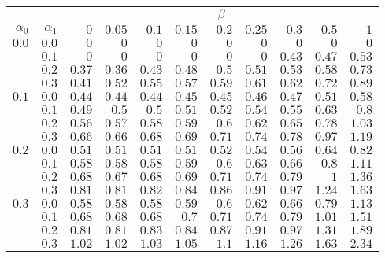 \begin{tabular}{rr|rrrrrrrrr}
\hline\hline
 && \multicolumn{9}{c}{$\beta$}\\
 $\alpha_0$ & $\alpha_1$ & $0$ & $0.05$ & $0.1$ & $0.15$ & $0.2$ & $0.25$ & $0.3$ & $0.5$ & $1$ \\ 
 \hline
$0.0$ & $0.0$ & $0$ & $0$ & $0$ & $0$ & $0$ & $0$ & $0$ & $0$ & $0$\\ 
 & $0.1$ & $0$ & $0$ & $0$ & $0$ & $0$ & $0$ & $0.43$ & $0.47$ & $0.53$\\ 
 & $0.2$ & $0.37$ & $0.36$ & $0.43$ & $0.48$ & $0.5$ & $0.51$ & $0.53$ & $0.58$ & $0.73$\\ 
 & $0.3$ & $0.41$ & $0.52$ & $0.55$ & $0.57$ & $0.59$ & $0.61$ & $0.62$ & $0.72$ & $0.89$\\ 
\hline 
 $0.1$ & $0.0$ & $0.44$ & $0.44$ & $0.44$ & $0.45$ & $0.45$ & $0.46$ & $0.47$ & $0.51$ & $0.58$\\ 
 & $0.1$ & $0.49$ & $0.5$ & $0.5$ & $0.51$ & $0.52$ & $0.54$ & $0.55$ & $0.63$ & $0.8$\\ 
 & $0.2$ & $0.56$ & $0.57$ & $0.58$ & $0.59$ & $0.6$ & $0.62$ & $0.65$ & $0.78$ & $1.03$\\ 
 & $0.3$ & $0.66$ & $0.66$ & $0.68$ & $0.69$ & $0.71$ & $0.74$ & $0.78$ & $0.97$ & $1.19$\\ 
\hline 
 $0.2$ & $0.0$ & $0.51$ & $0.51$ & $0.51$ & $0.51$ & $0.52$ & $0.54$ & $0.56$ & $0.64$ & $0.82$\\ 
 & $0.1$ & $0.58$ & $0.58$ & $0.58$ & $0.59$ & $0.6$ & $0.63$ & $0.66$ & $0.8$ & $1.11$\\ 
 & $0.2$ & $0.68$ & $0.67$ & $0.68$ & $0.69$ & $0.71$ & $0.74$ & $0.79$ & $1$ & $1.36$\\ 
 & $0.3$ & $0.81$ & $0.81$ & $0.82$ & $0.84$ & $0.86$ & $0.91$ & $0.97$ & $1.24$ & $1.63$\\ 
\hline 
 $0.3$ & $0.0$ & $0.58$ & $0.58$ & $0.58$ & $0.59$ & $0.6$ & $0.62$ & $0.66$ & $0.79$ & $1.13$\\ 
 & $0.1$ & $0.68$ & $0.68$ & $0.68$ & $0.7$ & $0.71$ & $0.74$ & $0.79$ & $1.01$ & $1.51$\\ 
 & $0.2$ & $0.81$ & $0.81$ & $0.83$ & $0.84$ & $0.87$ & $0.91$ & $0.97$ & $1.31$ & $1.89$\\ 
 & $0.3$ & $1.02$ & $1.02$ & $1.03$ & $1.05$ & $1.1$ & $1.16$ & $1.26$ & $1.63$ & $2.34$\\ 
 \hline 
 \end{tabular}